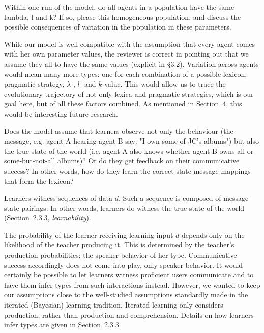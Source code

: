 \documentclass[12pt,a4paper]{article}
\begin{document}
\vspace{.5cm}
  \begin{mdframed}[backgroundcolor=gray!25,linecolor=gray!25]
Within one run of the model, do all agents in a population have the same lambda, l and k? If so, please this homogeneous population, and discuss the possible consequences of variation in the population in these parameters.
\end{mdframed}
While our model is well-compatible with the assumption that every agent comes with her own parameter values, the reviewer is correct in pointing out that we assume they all to have the same values (explicit in \S3.2). Variation across agents would mean many more types: one for each combination of a possible lexicon, pragmatic strategy, $\lambda$-, $l$- and $k$-value. This would allow us to trace the evolutionary trajectory of not only lexica and pragmatic strategies, which is our goal here, but of all these factors combined. As mentioned in Section~$4$, this would be interesting future research.

\vspace{.5cm}
\begin{mdframed}[backgroundcolor=gray!25,linecolor=gray!25]
Does the model assume that learners observe not only the behaviour (the message, e.g. agent A hearing agent B say: "I own some of JC's albums") but also the true state of the world (i.e. agent A also knows whether agent B owns all or some-but-not-all albums)? Or do they get feedback on their communicative success? In other words, how do they learn the correct state-message mappings that form the lexicon? 
\end{mdframed}
Learners witness sequences of data $d$. Such a sequence is composed of message-state pairings. In other words, learners do witness the true state of the world (Section~2.3.3, {\em learnability}).

The probability of the learner receiving learning input $d$ depends only on the likelihood of the teacher producing it. This is determined by the teacher's production probabilities; the speaker behavior of her type. Communicative success accordingly does not come into play, only speaker behavior. It would certainly be possible to let learners witness proficient users communicate and to have them infer types from such interactions instead. However, we wanted to keep our assumptions close to the well-studied assumptions standardly made in the iterated (Bayesian) learning tradition. Iterated learning only considers production, rather than production and comprehension. Details on how learners infer types are given in Section~2.3.3.
\end{document}
